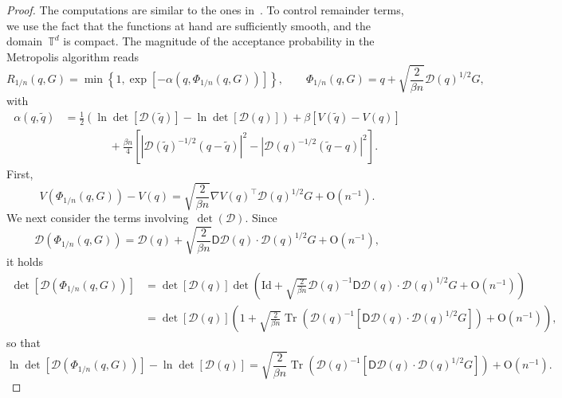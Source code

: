 \documentclass{article}
\newcommand{\Id}{\mathrm{Id}}
\def\T{\mathbb{T}}
\newcommand{\Diff}{\mathcal{D}}
\renewcommand{\dim}{d}
\begin{document}
\begin{proof}
  The computations are similar to the ones in~\cite[Section~4.7]{FS17}. %
  To control remainder terms, we use the fact that the functions at hand are sufficiently smooth, and the domain~$\T^\dim$ is compact. The magnitude of the acceptance probability in the Metropolis algorithm reads
\[
R_{1/n}(q, G) = \min \left\{ 1, \exp\left[-\alpha\left(q, \Phi_{1/n}(q,G)\right)\right] \right\}, \qquad \Phi_{1/n}(q,G) = q + \sqrt{\frac{2}{\beta n}}\Diff( q)^{1/2}G,
\]
with
\begin{equation}
  \label{eq:acceptance-rate}
  \begin{aligned}
    \alpha(q,\widetilde q) & = \frac{1}{2}\left( \ln \det[\Diff(\widetilde q)] - \ln \det[\Diff(q)] \right) + \beta\left[V(\widetilde q)-V(q)\right]\\
    & \qquad \qquad + \frac{\beta n}{4}\left[ \left|\Diff(\widetilde q)^{-1/2}(q-\widetilde q)\right|^2 - \left|\Diff(q)^{-1/2}(\widetilde q-q)\right|^2\right].
  \end{aligned}
\end{equation}
First,
\begin{equation}
  \label{eq:grad-term}
  V(\Phi_{1/n}(q,G)) - V(q) = \sqrt{\frac{2}{\beta n}}\nabla V(q)^{\top}\Diff( q)^{1/2}G + \mathrm{O}(n^{-1}).
\end{equation}
We next consider the terms involving~$\det(\Diff)$. Since
\[
\Diff(\Phi_{1/n}(q,G)) =  \Diff(q) + \sqrt{\frac{2}{\beta n}}\textsf{D}\Diff(q)\cdot \Diff( q)^{1/2}G + \mathrm{O}(n^{-1}),
\]
it holds
\begin{equation}
  \begin{aligned}
    \det[\Diff( \Phi_{1/n}(q,G))] & =  \det[\Diff( q)]\det( \Id +  \sqrt{\frac{2}{\beta n}}\Diff( q)^{-1}\textsf{D}\Diff(q)\cdot \Diff(q)^{1/2}G + \mathrm{O}(n^{-1}))\\
    & =  \det[\Diff( q)]\left(1+  \sqrt{\frac{2}{\beta n}}\operatorname{Tr}\left(\Diff( q)^{-1}[\textsf{D}\Diff(q)\cdot \Diff( q)^{1/2}G]\right) + \mathrm{O}(n^{-1})\right),
  \end{aligned}
\end{equation}
so that 
\begin{equation}
  \label{eq:det-term}
  \ln \det[\Diff(\Phi_{1/n}(q,G))] - \ln \det[\Diff( q)] = \sqrt{\frac{2}{\beta n}}\operatorname{Tr}\left(\Diff( q)^{-1} \left[\textsf{D}\Diff(q)\cdot \Diff( q)^{1/2}G\right]\right) + \mathrm{O}(n^{-1}).
\end{equation}


\end{proof}
\end{document}
